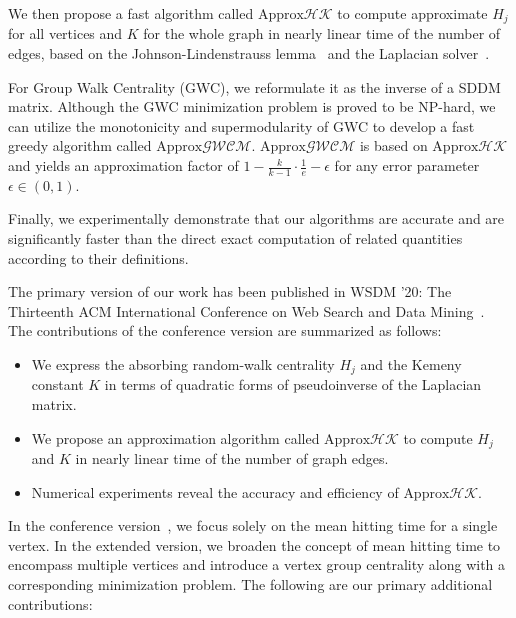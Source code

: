 \documentclass[10pt,twocolumn,twoside]{IEEEtran}
\begin{document}
We then propose a fast algorithm called \(\text{Approx}\mathcal{HK}\) to compute approximate \(H_j\) for all vertices and \(K\) for the whole graph in nearly linear time of the number of edges, based on the Johnson-Lindenstrauss lemma~\cite{Ac01} and the Laplacian solver~\cite{SpTe04,Sp10,KoMiPe11,LiBr12,CoKyMiPaPeRaSu14,KySa16,GaKySp23}.

For Group Walk Centrality (GWC), we reformulate it as the inverse of a SDDM matrix.
Although the GWC minimization problem is proved to be NP-hard, we can utilize the monotonicity and supermodularity of GWC to develop a fast greedy algorithm called \(\text{Approx}\mathcal{GWCM}\).
\(\text{Approx}\mathcal{GWCM}\) is based on \(\text{Approx}\mathcal{HK}\) and yields an approximation factor of \(1-\frac{k}{k-1}\cdot\frac{1}{e}-\epsilon\) for any error parameter \(\epsilon\in(0,1)\).

Finally, we experimentally demonstrate that our algorithms are accurate and are significantly faster than the direct exact computation of related quantities according to their definitions.

The primary version of our work has been published in WSDM '20: The Thirteenth ACM International Conference on Web Search and Data Mining~\cite{ZhXuZh20}. The contributions of the conference version are summarized as follows:

\begin{itemize}
    \item We express the absorbing random-walk centrality \(H_j\) and the Kemeny constant \(K\) in terms of quadratic forms of pseudoinverse of the Laplacian matrix.
    \item We propose an approximation algorithm called \(\text{Approx}\mathcal{HK}\) to compute \(H_j\) and \(K\) in nearly linear time of the number of graph edges.
    \item Numerical experiments reveal the accuracy and efficiency of \(\text{Approx}\mathcal{HK}\).
\end{itemize}

In the conference version~\cite{ZhXuZh20}, we focus solely on the mean hitting time for a single vertex.
In the extended version, we broaden the concept of mean hitting time to encompass multiple vertices and introduce a vertex group centrality along with a corresponding minimization problem.
The following are our primary additional contributions:
\end{document}
